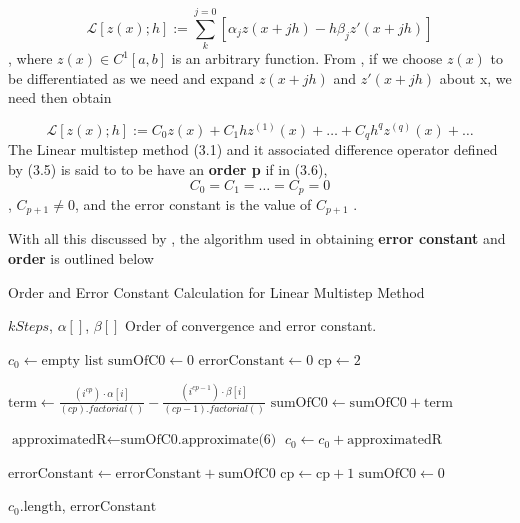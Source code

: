 \begin{equation}
   \mathcal{L}[z(x);h] := \sum_{k}^{j=0}[\alpha_jz(x+jh)-h\beta_jz'(x+jh)]
\end{equation}, where $z(x) \in C^1[a,b]$ is an arbitrary function. From \cite{lambert1977}, if we choose $z(x)$ to be differentiated as we need and expand $z(x+jh)$ and $z'(x+jh)$ about x, we need then obtain 

\begin{equation}
   \mathcal{L}[z(x);h] := C_0z(x)+ C_1hz^{(1)}(x)+ \dots + C_qh^qz^{(q)}(x)+ \dots
\end{equation}
The Linear multistep method (3.1) and it associated difference operator defined by (3.5) is said to to be have an \textbf{order p} if in (3.6), \[C_0 = C_1 = \dots = C_p = 0 \], $C_{p+1} \neq 0$, and the error constant is the value of $C_{p+1}$ \cite{lambert1977}.

With all this discussed by \cite{lambert1977}, the algorithm used in obtaining \textbf{error constant} and \textbf{order} is outlined below

\begin{algorithm}
   \caption{Order and Error Constant Calculation for Linear Multistep Method}
   \label{alg:order_error_constant}
   
   \begin{algorithmic}
   \REQUIRE \(kSteps\), \( \alpha[] \), \( \beta[] \) 
   \ENSURE Order of convergence and error constant.
   
   \STATE \( c_0 \gets \text{empty list} \) 
   \STATE \( \text{sumOfC0} \gets 0 \)
   \STATE \( \text{errorConstant} \gets 0 \)
   \STATE \( \text{cp} \gets 2 \) %
   
           \STATE \( \text{term} \gets \frac{(i^{cp}) \cdot \alpha[i]}{(cp).factorial()} - \frac{(i^{cp - 1}) \cdot \beta[i]}{(cp - 1).factorial()} \) 
           \STATE \( \text{sumOfC0} \gets \text{sumOfC0} + \text{term} \)
           
               \STATE \( \text{approximatedR} \gets \text{sumOfC0.approximate(6)} \)
               \STATE \( c_0 \gets c_0 + \text{approximatedR} \)
           \ENDIF
       \ENDFOR
       
           \STATE \( \text{errorConstant} \gets \text{errorConstant} + \text{sumOfC0} \)
               \STATE \( \text{cp} \gets \text{cp} + 1 \) 
               \STATE \( \text{sumOfC0} \gets 0 \)
               \STATE {}
           \ENDIF
           \STATE {} %
       \ELSE
           \STATE {}
       \ENDIF
       
   \ENDWHILE
   
   \RETURN \( c_0.\text{length} \), \( \text{errorConstant} \)
   
   \end{algorithmic}
   \end{algorithm}




